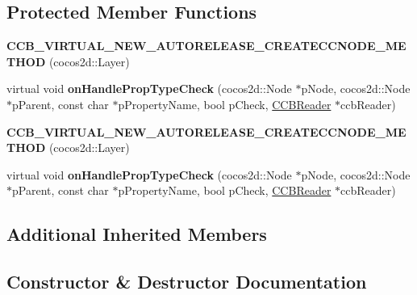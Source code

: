 \subsection*{Protected Member Functions}
\begin{DoxyCompactItemize}
\item 
\mbox{\label{classcocosbuilder_1_1LayerLoader_a2065804f5fd30222f33961b224706367}} 
{\bfseries C\+C\+B\+\_\+\+V\+I\+R\+T\+U\+A\+L\+\_\+\+N\+E\+W\+\_\+\+A\+U\+T\+O\+R\+E\+L\+E\+A\+S\+E\+\_\+\+C\+R\+E\+A\+T\+E\+C\+C\+N\+O\+D\+E\+\_\+\+M\+E\+T\+H\+OD} (cocos2d\+::\+Layer)
\item 
\mbox{\label{classcocosbuilder_1_1LayerLoader_a2621c2fe97a531a11436776009ff2596}} 
virtual void {\bfseries on\+Handle\+Prop\+Type\+Check} (cocos2d\+::\+Node $\ast$p\+Node, cocos2d\+::\+Node $\ast$p\+Parent, const char $\ast$p\+Property\+Name, bool p\+Check, \hyperlink{classcocosbuilder_1_1CCBReader}{C\+C\+B\+Reader} $\ast$ccb\+Reader)
\item 
\mbox{\label{classcocosbuilder_1_1LayerLoader_a2065804f5fd30222f33961b224706367}} 
{\bfseries C\+C\+B\+\_\+\+V\+I\+R\+T\+U\+A\+L\+\_\+\+N\+E\+W\+\_\+\+A\+U\+T\+O\+R\+E\+L\+E\+A\+S\+E\+\_\+\+C\+R\+E\+A\+T\+E\+C\+C\+N\+O\+D\+E\+\_\+\+M\+E\+T\+H\+OD} (cocos2d\+::\+Layer)
\item 
\mbox{\label{classcocosbuilder_1_1LayerLoader_a910853de3726ad758266f57ebd9f0552}} 
virtual void {\bfseries on\+Handle\+Prop\+Type\+Check} (cocos2d\+::\+Node $\ast$p\+Node, cocos2d\+::\+Node $\ast$p\+Parent, const char $\ast$p\+Property\+Name, bool p\+Check, \hyperlink{classcocosbuilder_1_1CCBReader}{C\+C\+B\+Reader} $\ast$ccb\+Reader)
\end{DoxyCompactItemize}
\subsection*{Additional Inherited Members}


\subsection{Constructor \& Destructor Documentation}
\mbox{\label{classcocosbuilder_1_1LayerLoader_abc4fcc903ab66147e64425ef18bdeefa}} 
